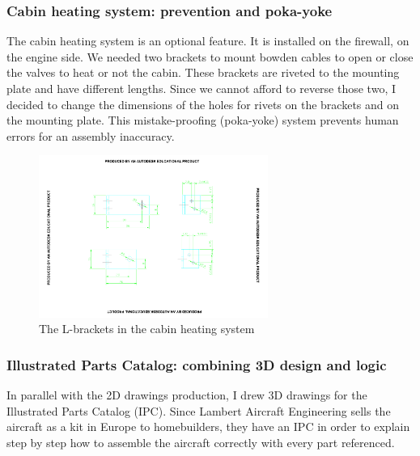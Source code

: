 \documentclass[11pt,a4paper]{article}
\begin{document}
\newpage

\subsubsection{Cabin heating system: prevention and poka-yoke}

The cabin heating system is an optional feature. It is installed on the firewall, on the engine side. We needed two brackets to mount bowden cables to open or close the valves to heat or not the cabin. These brackets are riveted to the mounting plate and have different lengths. Since we cannot afford to reverse those two, I decided to change the dimensions of the holes for rivets on the brackets and on the mounting plate. This mistake-proofing (poka-yoke) system prevents human errors for an assembly inaccuracy.

\begin{figure}[ht!]
	\begin{center}
		\includegraphics[width=7.5cm,trim = 6cm 4cm 6cm 3cm, clip]{pics/PIC009.pdf}
		\caption{The L-brackets in the cabin heating system}
		\label{fig:PIC009}
	\end{center}
\end{figure}

\newpage

\subsubsection{Illustrated Parts Catalog: combining 3D design and logic}
\label{subsubsec:IPC}

In parallel with the 2D drawings production, I drew 3D drawings for the Illustrated Parts Catalog (IPC). Since Lambert Aircraft Engineering sells the aircraft as a kit in Europe to homebuilders, they have an IPC in order to explain step by step how to assemble the aircraft correctly with every part referenced.

\bigskip
\end{document}
